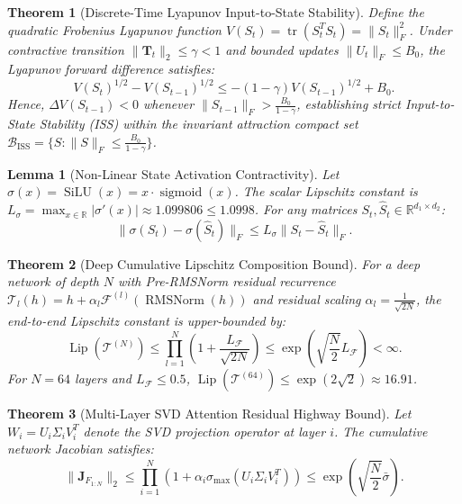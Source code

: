\documentclass[10pt,journal,compsoc]{IEEEtran}
\newtheorem{theorem}{Theorem}
\newtheorem{lemma}{Lemma}
\begin{document}
\begin{theorem}[Discrete-Time Lyapunov Input-to-State Stability]
Define the quadratic Frobenius Lyapunov function $V(S_t) = \operatorname{tr}(S_t^T S_t) = \|S_t\|_F^2$. Under contractive transition $\|\mathbf{T}_t\|_2 \le \gamma < 1$ and bounded updates $\|U_t\|_F \le B_0$, the Lyapunov forward difference satisfies:
\begin{equation}
V(S_t)^{1/2} - V(S_{t-1})^{1/2} \le -(1 - \gamma) V(S_{t-1})^{1/2} + B_0.
\end{equation}
Hence, $\Delta V(S_{t-1}) < 0$ whenever $\|S_{t-1}\|_F > \frac{B_0}{1 - \gamma}$, establishing strict Input-to-State Stability (ISS) within the invariant attraction compact set $\mathcal{B}_{\text{ISS}} = \{ S : \|S\|_F \le \frac{B_0}{1 - \gamma} \}$.
\end{theorem}

\begin{lemma}[Non-Linear State Activation Contractivity]
Let $\sigma(x) = \operatorname{SiLU}(x) = x \cdot \operatorname{sigmoid}(x)$. The scalar Lipschitz constant is $L_\sigma = \max_{x \in \mathbb{R}} |\sigma'(x)| \approx 1.099806 \le 1.0998$. For any matrices $S_t, \hat{S}_t \in \mathbb{R}^{d_1 \times d_2}$:
\begin{equation}
\|\sigma(S_t) - \sigma(\hat{S}_t)\|_F \le L_\sigma \|S_t - \hat{S}_t\|_F.
\end{equation}
\end{lemma}

\begin{theorem}[Deep Cumulative Lipschitz Composition Bound]
For a deep network of depth $N$ with Pre-RMSNorm residual recurrence $\mathcal{T}_l(h) = h + \alpha_l \mathcal{F}^{(l)}(\operatorname{RMSNorm}(h))$ and residual scaling $\alpha_l = \frac{1}{\sqrt{2N}}$, the end-to-end Lipschitz constant is upper-bounded by:
\begin{equation}
\operatorname{Lip}(\mathcal{T}^{(N)}) \le \prod_{l=1}^N \left( 1 + \frac{L_\mathcal{F}}{\sqrt{2N}} \right) \le \exp\left( \sqrt{\frac{N}{2}} L_\mathcal{F} \right) < \infty.
\end{equation}
For $N=64$ layers and $L_\mathcal{F} \le 0.5$, $\operatorname{Lip}(\mathcal{T}^{(64)}) \le \exp(2\sqrt{2}) \approx 16.91$.
\end{theorem}

\begin{theorem}[Multi-Layer SVD Attention Residual Highway Bound]
Let $W_i = U_i \Sigma_i V_i^T$ denote the SVD projection operator at layer $i$. The cumulative network Jacobian satisfies:
\begin{equation}
\|\mathbf{J}_{F_{1:N}}\|_2 \le \prod_{i=1}^N \left( 1 + \alpha_i \sigma_{\max}(U_i \Sigma_i V_i^T) \right) \le \exp\left( \sqrt{\frac{N}{2}} \bar{\sigma} \right).
\end{equation}
\end{theorem}
\end{document}
